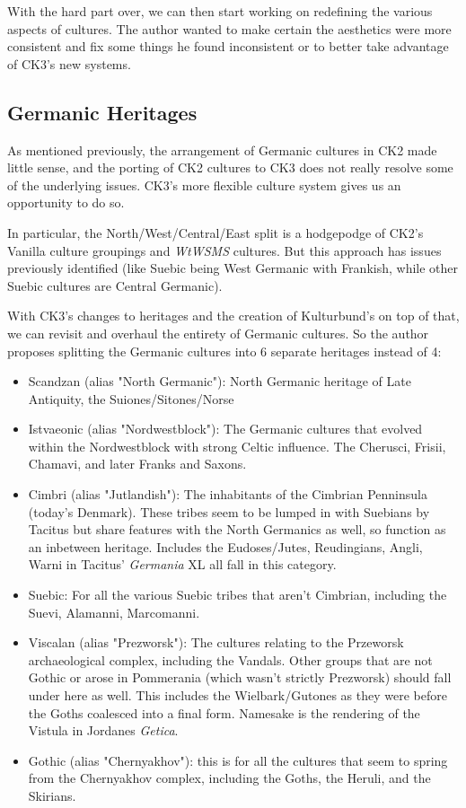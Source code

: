 \documentclass{article}
\begin{document}
	With the hard part over, we can then start working on redefining the various aspects of cultures.
	The author wanted to make certain the aesthetics were more consistent and fix some things he found inconsistent or to better take advantage of CK3's new systems.
	
	\subsection{Germanic Heritages}
	\label{sec:culture_review:subsec:germanic_heritages}
	As mentioned previously, the arrangement of Germanic cultures in CK2 made little sense, and the porting of CK2 cultures to CK3 does not really resolve some of the underlying issues.
	CK3's more flexible culture system gives us an opportunity to do so.
	
	In particular, the North/West/Central/East split is a hodgepodge of CK2's Vanilla culture groupings and \textit{WtWSMS} cultures.
	But this approach has issues previously identified (like Suebic being West Germanic with Frankish, while other Suebic cultures are Central Germanic).
	
	With CK3's changes to heritages and the creation of Kulturbund's on top of that, we can revisit and overhaul the entirety of Germanic cultures.
	So the author proposes splitting the Germanic cultures into 6 separate heritages instead of 4:
	
	\begin{itemize}
		\item Scandzan (alias "North Germanic"):  North Germanic heritage of Late Antiquity, the Suiones/Sitones/Norse
		\item Istvaeonic (alias "Nordwestblock"): The Germanic cultures that evolved within the Nordwestblock with strong Celtic influence.
		The Cherusci, Frisii, Chamavi, and later Franks and Saxons.
		\item Cimbri (alias "Jutlandish"): The inhabitants of the Cimbrian Penninsula (today's Denmark).
		These tribes seem to be lumped in with Suebians by Tacitus but share features with the North Germanics as well, so function as an inbetween heritage.
		Includes the Eudoses/Jutes, Reudingians, Angli, Warni in Tacitus' \textit{Germania} XL all fall in this category.
		\item Suebic: For all the various Suebic tribes that aren't Cimbrian, including the Suevi, Alamanni, Marcomanni.
		\item Viscalan (alias "Prezworsk"): The cultures relating to the Przeworsk archaeological complex, including the Vandals.
		Other groups that are not Gothic or arose in Pommerania (which wasn't strictly Prezworsk) should fall under here as well.
		This includes the Wielbark/Gutones as they were before the Goths coalesced into a final form.
		Namesake is the rendering of the Vistula in Jordanes \textit{Getica}.
		\item Gothic (alias "Chernyakhov"): this is for all the cultures that seem to spring from the Chernyakhov complex, including the Goths, the Heruli, and the Skirians.
	\end{itemize}
	
\end{document}
